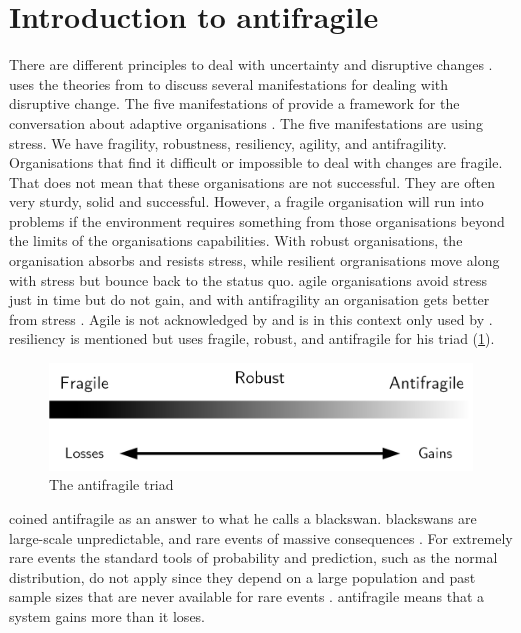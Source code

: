 \section{Introduction to antifragile}
\label{sec:introantifragility}
There are different principles to deal with uncertainty and disruptive changes \parencite[pp.~79--81]{Steen2018}. \Textcite[pp.~79--81]{Steen2018} uses the theories from \textcite{Taleb2012} to discuss several manifestations for dealing with disruptive change. The five manifestations of \textcite{Taleb2012} provide a framework for the conversation about adaptive organisations \parencite[pp.~79--81]{Steen2018}. The five manifestations are using stress. We have \gls{fragility}, \gls{robustness}, \gls{resiliency}, \gls{agility}, and \gls{antifragility}. Organisations that find it difficult or impossible to deal with changes are fragile. That does not mean that these organisations are not successful. They are often very sturdy, solid and successful. However, a fragile organisation will run into problems if the environment requires something from those organisations beyond the limits of the organisations capabilities. With robust organisations, the organisation absorbs and resists stress, while \gls{resilient} orgranisations move along with stress but bounce back to the status quo. \Gls{agile} organisations avoid stress just in time but do not gain, and with \gls{antifragility} an organisation gets better from stress \parencite[pp.~79-81]{Steen2018}. Agile is not acknowledged by \textcite{Taleb2012} and is in this context only used by \textcite{Steen2018}. \Gls{resiliency} is mentioned but \textcite{Taleb2012} uses \gls{fragile}, \gls{robust}, and \gls{antifragile} for his \gls{triad} (\cref{fig:antifragilesimple}).
\begin{figure}[H]
	\centering
	\includegraphics[width=0.6\linewidth]{images/antifragilesimple}
	\caption[The antifragile triad]{The antifragile triad}
	\label{fig:antifragilesimple}
\end{figure}
\textcite{Taleb2012} coined \gls{antifragile} as an answer to what he calls a \gls{blackswan}. \Glspl{blackswan} are large-scale unpredictable, and rare events of massive consequences \parencite[p.~6]{Taleb2012}. For extremely rare events the standard tools of probability and prediction, such as the normal distribution, do not apply since they depend on a large population and past sample sizes that are never available for rare events \textcite{Taleb2008}. \Gls{antifragile} means that a system gains more than it loses.

